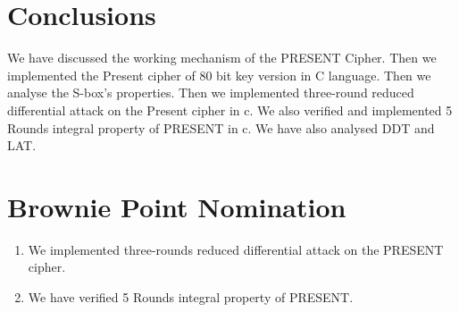 \documentclass[journal=tosc,preprint]{iacrtrans}
\begin{document}
\section{Conclusions}
 We have discussed the working mechanism of the PRESENT Cipher. Then we implemented  the Present cipher of 80 bit key version in C language. Then we analyse the S-box's properties. Then we implemented three-round reduced differential attack on the Present cipher in c. We also verified and implemented 5 Rounds integral property of PRESENT in c. We have also analysed DDT and LAT.
\section{Brownie Point Nomination}
\begin{enumerate}
	\item We implemented three-rounds reduced differential attack on the PRESENT cipher. 
	\item We have verified 5 Rounds integral property of PRESENT.
\end{enumerate}
\end{document}
